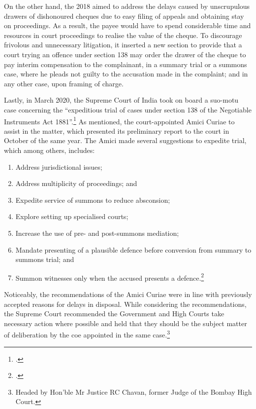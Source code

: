 \documentclass[12pt,a4paper]{article}
\begin{document}
On the other hand, the  2018 aimed to address the delays caused by unscrupulous drawers of dishonoured cheques due to easy filing of appeals and obtaining stay on proceedings. As a result, the payee would have to spend considerable time and resources in court proceedings to realise the value of the cheque. To discourage frivolous and unnecessary litigation, it inserted a new section to provide that a court trying an offence under section 138 may order the drawer of the cheque to pay interim compensation to the complainant, in a summary trial or a summons case, where he pleads not guilty to the accusation made in the complaint; and in any other case, upon framing of charge.

Lastly, in March 2020, the Supreme Court of India took on board a suo-motu case concerning the “expeditious trial of cases under section 138 of the Negotiable Instruments Act 1881”.\footcite{sc2020_138} As mentioned, the court-appointed Amici Curiae to assist in the matter, which presented its preliminary report to the court in October of the same year. The Amici made several suggestions to expedite trial, which among others, includes:

\begin{enumerate}[label=(\alph*)]
 \item Address jurisdictional issues;
 \item Address multiplicity of proceedings; and
 \item Expedite service of summons to reduce absconsion;
 \item Explore setting up specialised courts;
 \item Increase the use of pre- and post-summons mediation;
 \item Mandate presenting of a plausible defence before conversion from summary to summons trial; and
 \item Summon witnesses only when the accused presents a defence.\footcite{amicus2020_submission}
\end{enumerate}

Noticeably, the recommendations of the Amici Curiae were in line with previously accepted reasons for delays in disposal. While considering the recommendations, the Supreme Court recommended the Government and High Courts take necessary action where possible and held that they should be the subject matter of deliberation by the \gls{coe} appointed in the same case.\footnote{Headed by Hon’ble Mr Justice RC Chavan, former Judge of the Bombay High Court.}
\end{document}

